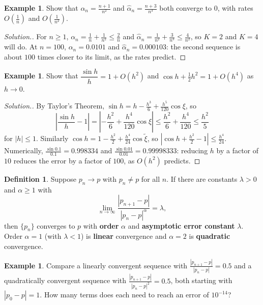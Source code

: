 \documentclass[11pt,a4paper]{article}
\numberwithin{equation}{section}
\theoremstyle{definition}
\newtheorem{defn}[thm]{Definition}
\newtheorem{exa}[thm]{Example}
\newenvironment{solution}
  {\renewcommand{\qedsymbol}{}\begin{proof}[\textit{Solution}.]}
  {\end{proof}}
\begin{document}
\begin{exa}
Show that $\alpha_n = \frac{n+1}{n^2}$ and $\hat\alpha_n = \frac{n+3}{n^3}$ both converge to $0$, with rates $O\left(\frac1n\right)$ and
$O\left(\frac1{n^2}\right)$.
\end{exa}

\begin{solution}
For $n\geq1$, $\alpha_n = \frac1n+\frac1{n^2}\leq\frac2n$ and $\hat\alpha_n = \frac1{n^2}+\frac3{n^3}\leq\frac4{n^2}$, so $K = 2$ and
$K = 4$ will do. At $n = 100$, $\alpha_n = 0.0101$ and $\hat\alpha_n = 0.000103$: the second sequence is about $100$ times closer to
its limit, as the rates predict.
\end{solution}

\begin{exa}
\label{exa:sinh}
Show that $\dfrac{\sin h}{h} = 1+O(h^2)$ and $\cos h + \frac12h^2 = 1+O(h^4)$ as $h\longrightarrow0$.
\end{exa}

\begin{solution}
By Taylor's Theorem, $\sin h = h - \frac{h^3}{6}+\frac{h^5}{120}\cos\xi$, so
$$\left|\frac{\sin h}{h}-1\right| = \left|-\frac{h^2}{6}+\frac{h^4}{120}\cos\xi\right|\leq\frac{h^2}{6}+\frac{h^4}{120}\leq\frac{h^2}{5}$$
for $|h|\leq1$. Similarly $\cos h = 1-\frac{h^2}{2}+\frac{h^4}{24}\cos\tilde\xi$, so $\left|\cos h+\frac{h^2}{2}-1\right|\leq\frac{h^4}{24}$. Numerically,
$\frac{\sin 0.1}{0.1} = 0.998334$ and $\frac{\sin 0.01}{0.01} = 0.99998333$: reducing $h$ by a factor of $10$ reduces the error by a
factor of $100$, as $O(h^2)$ predicts.
\end{solution}

\begin{defn}
\label{defn:order}
Suppose $p_n\longrightarrow p$ with $p_n\neq p$ for all $n$. If there are constants $\lambda>0$ and $\alpha\geq1$ with
$$\lim_{n\rightarrow\infty}\frac{|p_{n+1}-p|}{|p_n-p|^\alpha} = \lambda,$$
then $\{p_n\}$ converges to $p$ with \textbf{order} $\alpha$ and \textbf{asymptotic error constant} $\lambda$. Order $\alpha = 1$ (with
$\lambda<1$) is \textbf{linear} convergence and $\alpha = 2$ is \textbf{quadratic} convergence.
\end{defn}

\begin{exa}
\label{exa:linquad}
Compare a linearly convergent sequence with $\frac{|p_{n+1}-p|}{|p_n-p|} = 0.5$ and a quadratically convergent sequence with
$\frac{|p_{n+1}-p|}{|p_n-p|^2} = 0.5$, both starting with $|p_0-p| = 1$. How many terms does each need to reach an error of
$10^{-14}$?
\end{exa}
\end{document}
